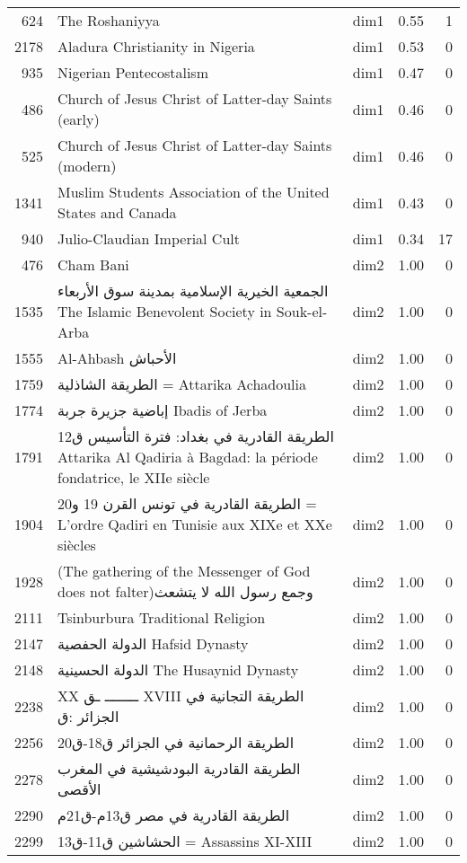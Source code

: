 \begin{tabular}{rllrr}
624 & The Roshaniyya & dim1 & 0.55 & 1 \\
2178 & Aladura Christianity in Nigeria & dim1 & 0.53 & 0 \\
935 & Nigerian Pentecostalism & dim1 & 0.47 & 0 \\
486 & Church of Jesus Christ of Latter-day Saints (early) & dim1 & 0.46 & 0 \\
525 & Church of Jesus Christ of Latter-day Saints (modern) & dim1 & 0.46 & 0 \\
1341 & Muslim Students Association of the United States and Canada & dim1 & 0.43 & 0 \\
940 & Julio-Claudian Imperial Cult & dim1 & 0.34 & 17 \\
476 & Cham Bani & dim2 & 1.00 & 0 \\
1535 & الجمعية الخيرية الإسلامية بمدينة سوق الأربعاء The Islamic Benevolent Society in Souk-el-Arba & dim2 & 1.00 & 0 \\
1555 & Al-Ahbash الأحباش & dim2 & 1.00 & 0 \\
1759 & الطريقة الشاذلية = Attarika Achadoulia & dim2 & 1.00 & 0 \\
1774 & إباضية جزيرة جربة Ibadis of Jerba & dim2 & 1.00 & 0 \\
1791 & الطريقة القادرية في بغداد: فترة التأسيس ق12 Attarika Al Qadiria à Bagdad: la période fondatrice, le XIIe siècle & dim2 & 1.00 & 0 \\
1904 & الطريقة القادرية في تونس القرن  19 و20   =  L'ordre Qadiri en Tunisie aux XIXe et XXe siècles & dim2 & 1.00 & 0 \\
1928 & (The gathering of the Messenger of God does not falter)وجمع رسول الله لا يتشعث & dim2 & 1.00 & 0 \\
2111 & Tsinburbura Traditional Religion & dim2 & 1.00 & 0 \\
2147 & الدولة الحفصية Hafsid Dynasty & dim2 & 1.00 & 0 \\
2148 & الدولة الحسينية The Husaynid Dynasty & dim2 & 1.00 & 0 \\
2238 & XX ــــــــ    ـق  XVIII   الطريقة التجانية في الجزائر :ق & dim2 & 1.00 & 0 \\
2256 & الطريقة الرحمانية في الجزائر  ق18-ق20 & dim2 & 1.00 & 0 \\
2278 & الطريقة القادرية البودشيشية في المغرب الأقصى & dim2 & 1.00 & 0 \\
2290 & الطريقة القادرية في مصر ق13م-ق21م & dim2 & 1.00 & 0 \\
2299 & الحشاشين  ق11-ق13   =   Assassins   XI-XIII & dim2 & 1.00 & 0 \\

\end{tabular}
